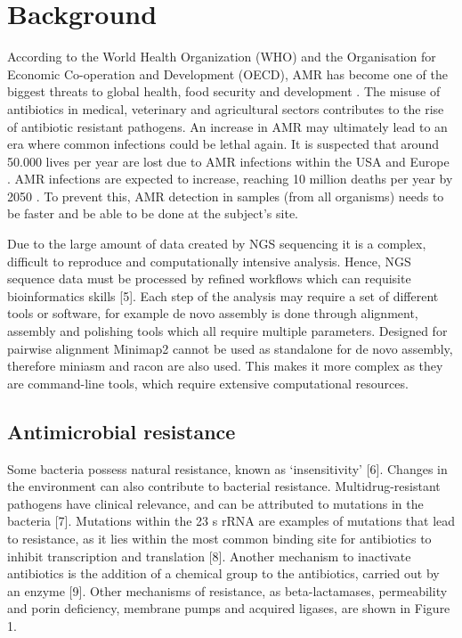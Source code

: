 \documentclass[a4paper,num-refs]{oup-contemporary}
\begin{document}
\section{Background}
According to the World Health Organization (WHO) and the Organisation for Economic Co-operation and Development (OECD), AMR has become one of the biggest threats to global health, food security and development \cite{OrganisationforEconomicCo-operationandDevelopment2017, WorldHealthOrganization2018}. The misuse of antibiotics in medical, veterinary and agricultural sectors contributes to the rise of antibiotic resistant pathogens. An increase in AMR may ultimately lead to an era where common infections could be lethal again. It is suspected that around 50.000 lives per year are lost due to AMR infections within the USA and Europe \cite{Simlai2016}. AMR infections are expected to increase, reaching 10 million deaths per year by 2050 \cite{ONeil2014}. To prevent this, AMR detection in samples (from all organisms) needs to be faster and be able to be done at the subject’s site. 

Due to the large amount of data created by NGS sequencing it is a complex, difficult to reproduce and computationally intensive analysis. Hence, NGS sequence data must be processed by refined workflows which can requisite bioinformatics skills [5]. Each step of the analysis may require a set of different tools or software, for example de novo assembly is done through alignment, assembly and polishing tools which all require multiple parameters. Designed for pairwise alignment Minimap2 cannot be used as standalone for de novo assembly, therefore miniasm and racon are also used. This makes it more complex as they are command-line tools, which require extensive computational resources. 

\subsection{Antimicrobial resistance}
Some bacteria possess natural resistance, known as ‘insensitivity’ [6]. Changes in the environment can also contribute to bacterial resistance. Multidrug-resistant pathogens have clinical relevance, and can be attributed to mutations in the bacteria [7]. Mutations within the 23 s rRNA are examples of mutations that lead to resistance, as it lies within the most common binding site for antibiotics to inhibit transcription and translation [8]. Another mechanism to inactivate antibiotics is the addition of a chemical group to the antibiotics, carried out by an enzyme [9]. Other mechanisms of resistance, as beta-lactamases, permeability and porin deficiency, membrane pumps and acquired ligases, are shown in Figure 1.
\end{document}
